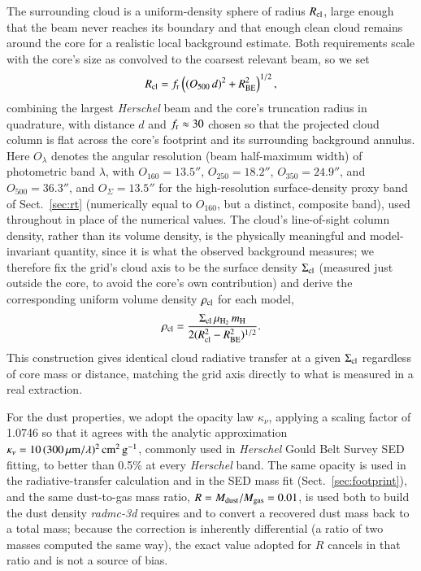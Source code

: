 \documentclass{aa}
\newcommand{\Scloud}{\Sigma_{\rm cl}}
\newcommand{\Rbe}{R_{\rm BE}}
\newcommand{\rhocloud}{\rho_{\rm cl}}
\newcommand{\Rcloud}{R_{\rm cl}}
\newcommand{\mH}{m_{\rm H}}
\newcommand{\muH}{\mu_{\rm H_2}}
\begin{document}
The surrounding cloud is a uniform-density sphere of radius $\Rcloud$,
large enough that the beam never reaches its boundary and that enough
clean cloud remains around the core for a realistic local background
estimate. Both requirements scale with the core's size as convolved to the
coarsest relevant beam, so we set
\begin{equation}
  \Rcloud = f_{\rm r}\left((O_{500}\,d)^2 + \Rbe^2\right)^{1/2},
  \label{eq:rcloud}
\end{equation}
combining the largest \emph{Herschel} beam and the core's truncation radius in
quadrature, with distance $d$ and $f_{{\rm r}} \approx 30$ chosen so that
the projected cloud column is flat across the core's footprint and its
surrounding background annulus. Here $O_\lambda$ denotes the angular
resolution (beam half-maximum width) of photometric band $\lambda$, with
$O_{160}=13.5''$, $O_{250}=18.2''$, $O_{350}=24.9''$, and
$O_{500}=36.3''$, and $O_\Sigma=13.5''$ for the high-resolution
surface-density proxy band of Sect.~\ref{sec:rt} (numerically equal to
$O_{160}$, but a distinct, composite band), used throughout in place of
the numerical values. The
cloud's line-of-sight column density, rather than its volume density, is
the physically meaningful and model-invariant quantity, since it is what
the observed background measures; we therefore fix the grid's cloud axis to
be the surface density $\Scloud$ (measured just outside the core, to avoid
the core's own contribution) and derive the corresponding uniform volume
density $\rhocloud$ for each model,
\begin{equation}
  \rhocloud = \frac{\Scloud\,\muH\,\mH}{2(\Rcloud^2 - \Rbe^2)^{1/2}} .
  \label{eq:sigmacloud}
\end{equation}
This construction gives identical cloud radiative transfer at a given
$\Scloud$ regardless of core mass or distance, matching the grid axis
directly to what is measured in a real extraction.

For the dust properties, we adopt the \citet{Ossenkopf+Henning1994} opacity
law $\kappa_\nu$, applying a scaling factor of 1.0746 so that it agrees with
the analytic approximation $\kappa_\nu = 10\,(300\,\mu{\rm m}/\lambda)^2\,
{\rm cm^2\,g^{-1}}$, commonly used in \emph{Herschel} Gould Belt Survey SED
fitting, to better than 0.5\% at every \emph{Herschel} band. The same opacity is
used in the radiative-transfer calculation and in the SED mass fit
(Sect.~\ref{sec:footprint}), and the same dust-to-gas mass ratio,
$R = M_{\rm dust}/M_{\rm gas} = 0.01$, is used both to build the
dust density \emph{radmc-3d} requires and to convert a recovered dust mass back to
a total mass; because the correction is inherently differential (a ratio of
two masses computed the same way), the exact value adopted for $R$ cancels
in that ratio and is not a source of bias.
\end{document}
